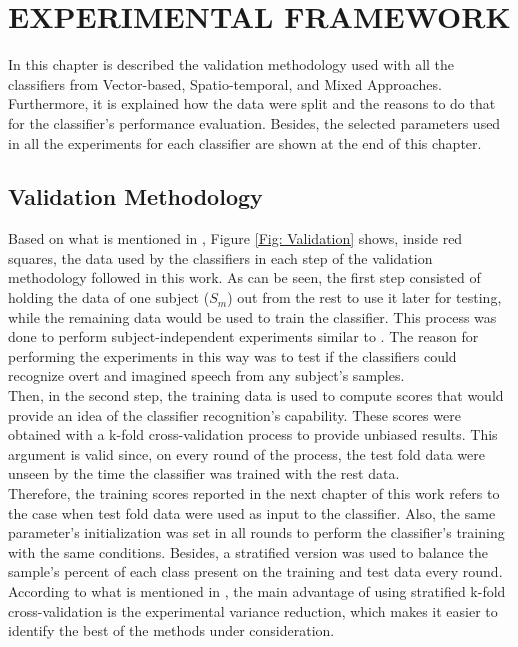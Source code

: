 \chapter[EXPERIMENTAL FRAMEWORK]{\huge EXPERIMENTAL FRAMEWORK}
In this chapter is described the validation methodology used with all the classifiers from Vector-based, Spatio-temporal, and Mixed Approaches. Furthermore, it is explained how the data were split and the reasons to do that for the classifier's performance evaluation. Besides, the selected parameters used in all the experiments for each classifier are shown at the end of this chapter.\\

\section{Validation Methodology}
Based on what is mentioned in \cite{brownlee}, Figure \ref{Fig: Validation} shows, inside red squares, the data used by the classifiers in each step of the validation methodology followed in this work. As can be seen, the first step consisted of holding the data of one subject ($S_{m}$) out from the rest to use it later for testing, while the remaining data would be used to train the classifier. This process was done to perform subject-independent experiments similar to \cite{torres2013analisis,torres2016implementing,zhao2015classifying,zhao2013combining}. The reason for performing the experiments in this way was to test if the classifiers could recognize overt and imagined speech from any subject's samples.\\

Then, in the second step, the training data is used to compute scores that would provide an idea of the classifier recognition's capability. These scores were obtained with a k-fold cross-validation process to provide unbiased results. This argument is valid since, on every round of the process, the test fold data were unseen by the time the classifier was trained with the rest data.\\

Therefore, the training scores reported in the next chapter of this work refers to the case when test fold data were used as input to the classifier. Also, the same parameter's initialization was set in all rounds to perform the classifier's training with the same conditions. Besides, a stratified version was used to balance the sample's percent of each class present on the training and test data every round. According to what is mentioned in \cite{forman2010apples}, the main advantage of using stratified k-fold cross-validation is the experimental variance reduction, which makes it easier to identify the best of the methods under consideration.\\

